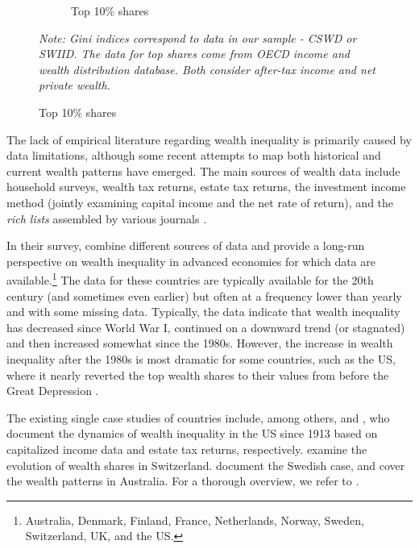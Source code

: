 \begin{refsection}
\begin{figure}[h]
\begin{subfigure}{0.49\textwidth}
    \caption{Top 10\% shares}
    \label{ch3fig:wealthincome_comp_b}
  \end{subfigure}
  \begin{minipage}{0.9\textwidth}
    \footnotesize
    \emph{Note: Gini indices correspond to data in our sample - \ac{CSWD} or \ac{SWIID}. The data for top shares come from \ac{OECD} income and wealth distribution database. Both consider after-tax income and net private wealth.}
    \end{minipage}
\end{figure}

The lack of empirical literature regarding wealth inequality is primarily caused by data limitations, although some recent attempts to map both historical and current wealth patterns have emerged. The main sources of wealth data include household surveys, wealth tax returns, estate tax returns, the investment income method (jointly examining capital income and the net rate of return), and the \textit{rich lists} assembled by various journals \parencite{davies2000distribution}. 

In their survey, \textcite{roine2015long} combine different sources of data and provide a long-run perspective on wealth inequality in advanced economies for which data are available.\footnote{Australia, Denmark, Finland, France, Netherlands, Norway, Sweden, Switzerland, UK, and the US.} The data for these countries are typically available for the 20th century (and sometimes even earlier) but often at a frequency lower than yearly and with some missing data. Typically, the data indicate that wealth inequality has decreased since World War I, continued on a downward trend (or stagnated) and then increased somewhat since the 1980s. However, the increase in wealth inequality after the 1980s is most dramatic for some countries, such as the US, where it nearly reverted the top wealth shares to their values from before the Great Depression \parencite{piketty2014}. 

The existing single case studies of countries include, among others, \textcite{SaezZucman2016} and \textcite{kopczuksaez2004}, who document the dynamics of wealth inequality in the US since 1913 based on capitalized income data and estate tax returns, respectively. \textcite{dell2007income} examine the evolution of wealth shares in Switzerland. \textcite{roine2009wealth} document the Swedish case, and \textcite{katic2016top} cover the wealth patterns in Australia. For a thorough overview, we refer to \textcite{roine2015long}.


\end{refsection}
